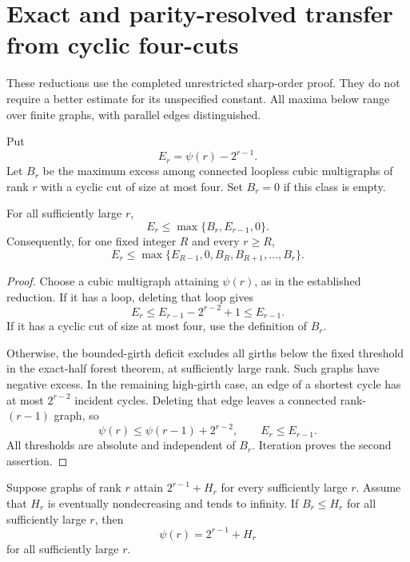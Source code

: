 \section{Exact and parity-resolved transfer from cyclic four-cuts}
\label{sec:new-coefficient-transfer}

These reductions use the completed unrestricted sharp-order proof.
They do not require a better estimate for its unspecified constant.
All maxima below range over finite graphs, with parallel edges distinguished.

Put
\[
 E_r=\psi(r)-2^{r-1}.
\]
Let $B_r$ be the maximum excess among connected loopless cubic multigraphs of rank $r$ with a cyclic cut of size at most four.
Set $B_r=0$ if this class is empty.

\begin{proposition}
\label{prop:new-excess-recurrence}
For all sufficiently large $r$,
\[
 E_r\le\max\{B_r,E_{r-1},0\}.
\]
Consequently, for one fixed integer $R$ and every $r\ge R$,
\[
 E_r\le\max\{E_{R-1},0,B_R,B_{R+1},\ldots,B_r\}.
\]
\end{proposition}

\begin{proof}
Choose a cubic multigraph attaining $\psi(r)$, as in the established reduction.
If it has a loop, deleting that loop gives
\[
 E_r\le E_{r-1}-2^{r-2}+1\le E_{r-1}.
\]
If it has a cyclic cut of size at most four, use the definition of $B_r$.

Otherwise, the bounded-girth deficit excludes all girths below the fixed threshold in the exact-half forest theorem, at sufficiently large rank.
Such graphs have negative excess.
In the remaining high-girth case, an edge of a shortest cycle has at most $2^{r-2}$ incident cycles.
Deleting that edge leaves a connected rank-$(r-1)$ graph, so
\[
 \psi(r)\le\psi(r-1)+2^{r-2},
 \qquad E_r\le E_{r-1}.
\]
All thresholds are absolute and independent of $B_r$.
Iteration proves the second assertion.
\end{proof}

\begin{corollary}
\label{cor:new-eventual-exact-transfer}
Suppose graphs of rank $r$ attain $2^{r-1}+H_r$ for every sufficiently large $r$.
Assume that $H_r$ is eventually nondecreasing and tends to infinity.
If $B_r\le H_r$ for all sufficiently large $r$, then
\[
 \psi(r)=2^{r-1}+H_r
\]
for all sufficiently large $r$.
\end{corollary}

